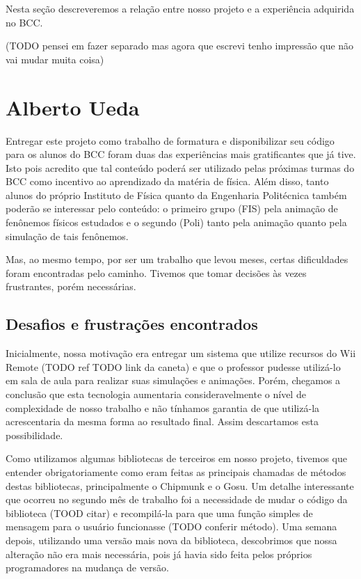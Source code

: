 Nesta seção descreveremos a relação entre nosso projeto e a experiência adquirida no BCC.

(TODO pensei em fazer separado mas agora que escrevi tenho impressão que não vai mudar muita coisa)

\section{Alberto Ueda}
Entregar este projeto como trabalho de formatura e disponibilizar seu código para os alunos do BCC foram duas das experiências mais gratificantes que já tive. Isto pois acredito que tal conteúdo poderá ser utilizado pelas próximas turmas do BCC como incentivo ao aprendizado da matéria de física. Além disso, tanto alunos do próprio Instituto de Física quanto da Engenharia Politécnica também poderão se interessar pelo conteúdo: o primeiro grupo (FIS) pela animação de fenônemos físicos estudados e o segundo (Poli) tanto pela animação quanto pela simulação de tais fenônemos.

Mas, ao mesmo tempo, por ser um trabalho que levou meses, certas dificuldades foram encontradas pelo caminho. Tivemos que tomar decisões às vezes frustrantes, porém necessárias.

\subsection{Desafios e frustrações encontrados}
Inicialmente, nossa motivação era entregar um sistema que utilize recursos do Wii Remote (TODO ref TODO link da caneta) e que o professor pudesse utilizá-lo em sala de aula para realizar suas simulações e animações. Porém, chegamos a conclusão que esta tecnologia aumentaria consideravelmente o nível de complexidade de nosso trabalho e não tínhamos garantia de que utilizá-la acrescentaria da mesma forma ao resultado final. Assim descartamos esta possibilidade.

Como utilizamos algumas bibliotecas de terceiros em nosso projeto, tivemos que entender obrigatoriamente como eram feitas as principais chamadas de métodos destas bibliotecas, principalmente o Chipmunk e o Gosu. Um detalhe interessante que ocorreu no segundo mês de trabalho foi a necessidade de mudar o código da biblioteca (TOOD citar) e recompilá-la para que uma função simples de mensagem para o usuário funcionasse (TODO conferir método). Uma semana depois, utilizando uma versão mais nova da biblioteca, descobrimos que nossa alteração não era mais necessária, pois já havia sido feita pelos próprios programadores na mudança de versão.

